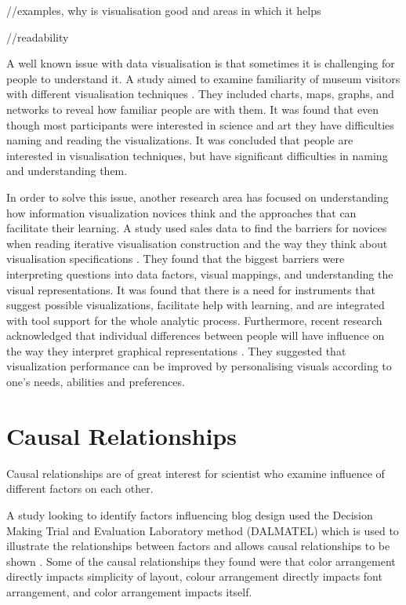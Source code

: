 \documentclass{l4proj}
\begin{document}
//examples, why is visualisation good and areas in which it helps


//readability

A well known issue with data visualisation is that sometimes it is challenging for people to understand it. A study aimed to examine familiarity of museum visitors with different visualisation techniques \cite{borner2015investigating}. They included charts, maps, graphs, and networks to reveal how familiar people are with them. It was found that even though most participants were interested in science and art they have difficulties naming and reading the visualizations. It was concluded that people are interested in visualisation techniques, but have significant difficulties in naming and understanding them. 

In order to solve this issue, another research area has focused on understanding how information visualization novices think and the approaches that can facilitate their learning. A study used sales data to find the barriers for novices when reading iterative visualisation construction and the way they think about visualisation specifications \cite{grammel2010information}. They found that the biggest barriers were interpreting questions into data factors, visual mappings, and understanding the visual representations. It was found that there is a need for instruments that suggest possible visualizations, facilitate help with learning, and are integrated with tool support for the whole analytic process. Furthermore, recent research acknowledged that individual differences between people will have influence on the way they interpret graphical representations \cite{Steichen:2013:UIV:2449396.2449439}. They suggested that visualization performance can be improved by personalising visuals according to one's needs, abilities and preferences.

\section{Causal Relationships}

Causal relationships are of great interest for scientist who examine influence of different factors on each other.

A study looking to identify factors influencing blog design used the Decision Making Trial and Evaluation Laboratory method (DALMATEL) which is used to illustrate the relationships between factors and allows causal relationships to be shown \cite{hsu2012evaluation}. Some of the causal relationships they found were that color arrangement directly impacts simplicity of layout, colour arrangement directly impacts font arrangement, and color arrangement impacts itself. 
\end{document}
